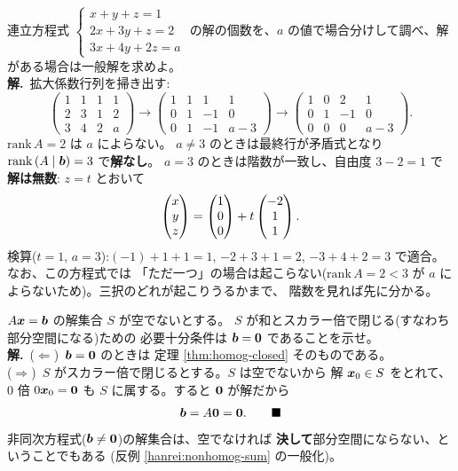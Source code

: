 \begin{rei}[例題・標準(パラメータによる場合分け)]\label{rei:sol-case}
連立方程式
$\begin{cases}
x + y + z = 1 \\
2x + 3y + z = 2 \\
3x + 4y + 2z = a
\end{cases}$
の解の個数を、$a$ の値で場合分けして調べ、解がある場合は一般解を求めよ。\\
\textbf{解.}\ 拡大係数行列を掃き出す:
\[
\left(\begin{array}{ccc|c}
1 & 1 & 1 & 1 \\ 2 & 3 & 1 & 2 \\ 3 & 4 & 2 & a
\end{array}\right)
\longrightarrow
\left(\begin{array}{ccc|c}
1 & 1 & 1 & 1 \\ 0 & 1 & -1 & 0 \\ 0 & 1 & -1 & a - 3
\end{array}\right)
\longrightarrow
\left(\begin{array}{ccc|c}
1 & 0 & 2 & 1 \\ 0 & 1 & -1 & 0 \\ 0 & 0 & 0 & a - 3
\end{array}\right).
\]
$\mathrm{rank}\,A = 2$ は $a$ によらない。
$a \neq 3$ のときは最終行が矛盾式となり
$\mathrm{rank}\,(A \mid \bm{b}) = 3$ で\textbf{解なし}。
$a = 3$ のときは階数が一致し、自由度 $3 - 2 = 1$ で\textbf{解は無数}:
$z = t$ とおいて
\[
\begin{pmatrix}x \\ y \\ z\end{pmatrix} = \begin{pmatrix}1 \\ 0 \\ 0\end{pmatrix} + t\begin{pmatrix}-2 \\ 1 \\ 1\end{pmatrix}.
\]
検算($t = 1$, $a = 3$):$(-1) + 1 + 1 = 1$, $-2 + 3 + 1 = 2$,
$-3 + 4 + 2 = 3$ で適合。なお、この方程式では
「ただ一つ」の場合は起こらない($\mathrm{rank}\,A = 2 < 3$ が
$a$ によらないため)。三択のどれが起こりうるかまで、
階数を見れば先に分かる。
\end{rei}

\begin{rei}[例題・標準(証明:閉じるのは同次のときだけ)]\label{rei:sol-closed}
$A\bm{x} = \bm{b}$ の解集合 $S$ が空でないとする。
$S$ が和とスカラー倍で閉じる(すなわち部分空間になる)ための
必要十分条件は $\bm{b} = \bm{0}$ であることを示せ。\\
\textbf{解.}\ ($\Leftarrow$)\ $\bm{b} = \bm{0}$ のときは
定理 \ref{thm:homog-closed} そのものである。\\
($\Rightarrow$)\ $S$ がスカラー倍で閉じるとする。$S$ は空でないから
解 $\bm{x}_0 \in S$ をとれて、$0$ 倍 $0\bm{x}_0 = \bm{0}$ も
$S$ に属する。すると $\bm{0}$ が解だから
\[
\bm{b} = A\bm{0} = \bm{0}. \qquad \blacksquare
\]
非同次方程式($\bm{b} \neq \bm{0}$)の解集合は、空でなければ
\textbf{決して}部分空間にならない、ということでもある
(反例 \ref{hanrei:nonhomog-sum} の一般化)。
\end{rei}

